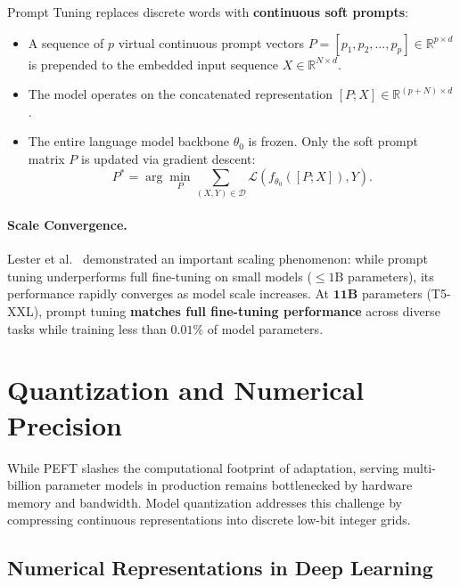 \documentclass[../../../main.tex]{subfiles}
\begin{document}
Prompt Tuning replaces discrete words with \textbf{continuous soft prompts}:
\begin{itemize}
    \item A sequence of $p$ virtual continuous prompt vectors $P = [p_1, p_2, \dots, p_p] \in \mathbb{R}^{p \times d}$ is prepended to the embedded input sequence $X \in \mathbb{R}^{N \times d}$.
    \item The model operates on the concatenated representation $[P; X] \in \mathbb{R}^{(p + N) \times d}$.
    \item The entire language model backbone $\theta_0$ is frozen. Only the soft prompt matrix $P$ is updated via gradient descent:
    \begin{equation}
    P^* = \arg\min_P \sum_{(X, Y) \in \mathcal{D}} \mathcal{L}(f_{\theta_0}([P; X]), Y).
    \end{equation}
\end{itemize}

\paragraph{Scale Convergence.}
Lester et al.~\citep{lester2021power} demonstrated an important scaling phenomenon: while prompt tuning underperforms full fine-tuning on small models ($\le 1\text{B}$ parameters), its performance rapidly converges as model scale increases. At $\mathbf{11\text{B}}$ parameters (T5-XXL), prompt tuning \textbf{matches full fine-tuning performance} across diverse tasks while training less than $0.01\%$ of model parameters.

\section{Quantization and Numerical Precision}
\label{sec:quantization_numerical_precision}

While PEFT slashes the computational footprint of adaptation, serving multi-billion parameter models in production remains bottlenecked by hardware memory and bandwidth. Model quantization addresses this challenge by compressing continuous representations into discrete low-bit integer grids.

\subsection{Numerical Representations in Deep Learning}
\label{subsec:numerical_representations}
\end{document}
